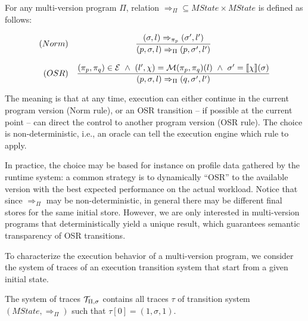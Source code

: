 \begin{definition}
\label{de:osr-semantics}
For any multi-version program $\Pi$, relation $\Rightarrow_{\Pi}\subseteq MState\times MState$ is defined as follows:%

\begin{footnotesize}
\begin{equation}
\label{eq:mv-big-step}
\begin{array}{rc}
(Norm)
&
\dfrac
{(\sigma, l)\Rightarrow_{\pi_p} (\sigma',l')}
{(p,\sigma, l)\Rightarrow_{\Pi} (p,\sigma',l')}
\\
\\
(OSR)
&
\dfrac
{(\pi_p,\pi_q)\in {\cal E} ~ \wedge ~ (l',\chi)={\cal M}(\pi_p,\pi_q)(l) ~ \wedge ~ \sigma'=[\![\chi]\!](\sigma)}
{(p,\sigma, l)\Rightarrow_{\Pi} (q,\sigma',l')}\\
\end{array}
\end{equation}
\end{footnotesize}
\end{definition}

\noindent The meaning is that at any time, execution can either continue in the current program version (Norm rule), or an OSR transition -- if possible at the current point -- can direct the control to another program version (OSR rule). The choice is non-deterministic, i.e., an oracle can tell the execution engine which rule to apply.

In practice, the choice may be based for instance on profile data gathered by the runtime system: a common strategy is to dynamically ``OSR'' to the available version with the best expected performance on the actual workload. Notice that since $\Rightarrow_{\Pi}$ may be non-deterministic, in general there may be different final stores for the same initial store. However, we are only interested in multi-version programs that deterministically yield a unique result, which guarantees semantic transparency of OSR transitions. 

To characterize the execution behavior of a multi-version program, we consider the system of traces of an execution transition system that start from a given initial state.

\begin{definition}
\label{de:mvp-exec-system}
The system of traces ${\cal T}_{\Pi,\sigma}$ contains all traces $\tau$ of transition system $(MState,\Rightarrow_{\Pi})$ such that $\tau[0]=(1,\sigma,1)$.
\end{definition}

